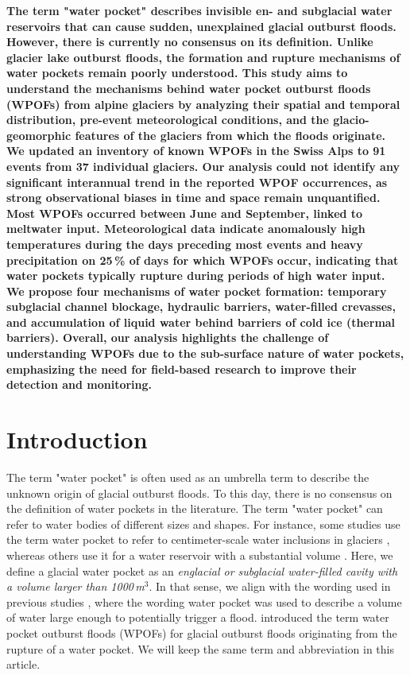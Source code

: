 \textbf{The term "water pocket" describes invisible en- and subglacial water reservoirs that can cause sudden, unexplained glacial outburst floods. However, there is currently no consensus on its definition. Unlike glacier lake outburst floods, the formation and rupture mechanisms of water pockets remain poorly understood. This study aims to understand the mechanisms behind water pocket outburst floods (WPOFs) from alpine glaciers by analyzing their spatial and temporal distribution, pre-event meteorological conditions, and the glacio-geomorphic features of the glaciers from which the floods originate. We updated an inventory of known WPOFs in the Swiss Alps to 91 events from 37 individual glaciers. Our analysis could not identify any significant interannual trend in the reported WPOF occurrences, as strong observational biases in time and space remain unquantified. Most WPOFs occurred between June and September, linked to meltwater input. Meteorological data indicate anomalously high temperatures during the days preceding most events and heavy precipitation on 25\,\% of days for which WPOFs occur, indicating that water pockets typically rupture during periods of high water input. We propose four mechanisms of water pocket formation: temporary subglacial channel blockage, hydraulic barriers, water-filled crevasses, and accumulation of liquid water behind barriers of cold ice (thermal barriers). Overall, our analysis highlights the challenge of understanding WPOFs due to the sub-surface nature of water pockets, emphasizing the need for field-based research to improve their detection and monitoring.}



\section{ Introduction}

The term "water pocket" is often used as an umbrella term to describe the unknown origin of glacial outburst floods. To this day, there is no consensus on the definition of water pockets in the literature. The term "water pocket" can refer to water bodies of different sizes and shapes. For instance, some studies use the term water pocket to refer to centimeter-scale water inclusions in glaciers \citep{Vivian&Bocquet1973,Raymond&Harrison1975,Holmlund1988,Fountain&Walder1998,Murray&al2000b}, whereas others use it for a water reservoir with a substantial volume \citep{Beecroft1983, Haeberli&al1989,Tweed&Russel1999,Vincent&al2010b}. Here, we define a glacial water pocket as an {\it englacial or subglacial water-filled cavity with a volume larger than 1000\,m$^3$}. In that sense, we align with the wording used in previous studies \citep{Haeberli&al1989,Deline&al2004,Roberts2005, Vincent&al2010b}, where the wording water pocket was used to describe a volume of water large enough to potentially trigger a flood. \cite{Deline&al2004} introduced the term water pocket outburst floods (WPOFs) for glacial outburst floods originating from the rupture of a water pocket. We will keep the same term and abbreviation in this article.


